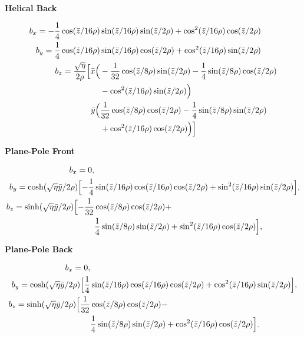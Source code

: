 \documentclass[12pt]{article}%
\begin{document}
{\bf Helical Back}

\begin{align}
b_x  =  -\frac{1}{4}\cos(\bar{z}/16\rho) & \sin(\bar{z}/16\rho)    \sin(\bar{z}/2\rho)   +   \cos^2(\bar{z} / 16\rho)  \cos(\bar{z}/2\rho)  \\
b_y =  \frac{1}{4}\cos(\bar{z}/16\rho) & \sin(\bar{z}/16\rho)    \cos(\bar{z}/2\rho)   +  \cos^2(\bar{z} / 16\rho)  \sin(\bar{z}/2\rho)\\
b_z = \frac{\sqrt{\eta}}{2\rho} \Bigl[   \bar{x}\Bigl(& -\frac{1}{32}\cos( \bar{z}/8\rho )\sin(\bar{z}/2\rho) -
           \frac{1}{4}\sin(\bar{z}/8\rho)\cos(\bar{z}/2\rho) \nonumber  \\
           & - \cos^2(\bar{z}/16\rho)\sin(\bar{z}/2\rho) \Bigr) \nonumber \\
           \bar{y}\Bigl(& \frac{1}{32}\cos( \bar{z}/8\rho )\cos(\bar{z}/2\rho) - \frac{1}{4}\sin(\bar{z}/8\rho)\sin(\bar{z}/2\rho) \nonumber  \\
           & + \cos^2(\bar{z}/16\rho)\cos(\bar{z}/2\rho) \Bigr)  \Bigr] 
\end{align}



{\bf Plane-Pole Front}

\begin{align}
b_x  =  0,  &    \\
b_y   = \cosh(\sqrt{\eta}\bar{y} / 2\rho)\Bigl[ -\frac{1}{4}& \sin(\bar{z}/16\rho) \cos(\bar{z}/16\rho) \cos(\bar{z} / 2\rho) +   \sin^2(\bar{z}/16\rho) \sin(\bar{z} / 2\rho)   \Bigr], \\
b_z  =  \sinh(\sqrt{\eta}\bar{y} / 2\rho) \Bigl[ -\frac{1}{32} & \cos(\bar{z}/8\rho) \cos(\bar{z}/2\rho) + \nonumber \\ 
                                                &\frac{1}{4}  \sin(\bar{z}/8\rho)\sin(\bar{z}/2\rho) + \sin^2  (\bar{z}/16\rho) \cos(\bar{z}/2\rho)  \Bigr],
\end{align}

{\bf Plane-Pole Back}

\begin{align}
b_x  =  0,  &    \\
b_y   = \cosh(\sqrt{\eta}\bar{y} / 2\rho)\Bigl[ \frac{1}{4}& \sin(\bar{z}/16\rho) \cos(\bar{z}/16\rho) \cos(\bar{z} / 2\rho) +   \cos^2(\bar{z}/16\rho) \sin(\bar{z} / 2\rho)   \Bigr], \\
b_z  =  \sinh(\sqrt{\eta}\bar{y} / 2\rho) \Bigl[ \frac{1}{32} & \cos(\bar{z}/8\rho) \cos(\bar{z}/2\rho) - \nonumber \\ 
                                                &\frac{1}{4}  \sin(\bar{z}/8\rho)\sin(\bar{z}/2\rho) + \cos^2  (\bar{z}/16\rho) \cos(\bar{z}/2\rho)  \Bigr].
\end{align}
\end{document}
